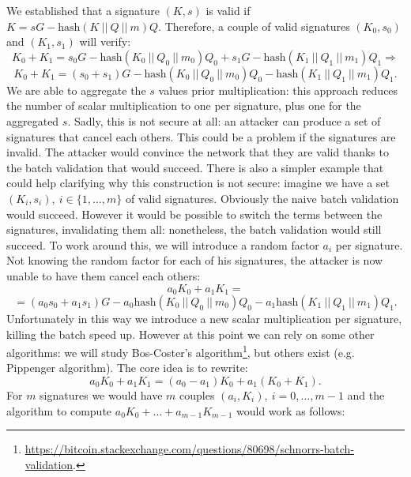 \bigskip
\noindent
We established that a signature $(K, s)$ is valid if $K = sG - \text{hash}(K \ || \ Q \ || \ m)Q$. 
Therefore, a couple of valid signatures $(K_0, s_0)$ and $(K_1, s_1)$ will verify:
$$K_0 + K_1 = s_0G - \text{hash}(K_0 \ || \ Q_0 \ || \ m_0)Q_0 + s_1G - \text{hash}(K_1 \ || \ Q_1 \ || \ m_1)Q_1 \Longrightarrow
$$
$$K_0 + K_1 = (s_0 + s_1)G - \text{hash}(K_0 \ || \ Q_0 \ || \ m_0)Q_0 - \text{hash}(K_1 \ || \ Q_1 \ || \ m_1)Q_1.$$
We are able to aggregate the $s$ values prior multiplication: this approach reduces the number of scalar multiplication to one per signature, plus one for the aggregated $s$. Sadly, this is not secure at all: an attacker can produce a set of signatures that cancel each others. This could be a problem if the signatures are invalid. The attacker would convince the network that they are valid thanks to the batch validation that would succeed. There is also a simpler example that could help clarifying why this construction is not secure: imagine we have a set $(K_i, s_i), \ i \in \{1, ..., m\}$ of valid signatures. Obviously the naive batch validation would succeed. However it would be possible to switch the terms between the signatures, invalidating them all: nonetheless, the batch validation would still succeed. To work around this, we will introduce a random factor $a_i$ per signature. Not knowing the random factor for each of his signatures, the attacker is now unable to have them cancel each others:
$$a_0K_0 + a_1K_1 = $$
$$= (a_0s_0 + a_1s_1)G - a_0\text{hash}(K_0 \ || \ Q_0 \ || \ m_0)Q_0 - a_1\text{hash}(K_1 \ || \ Q_1 \ || \ m_1)Q_1.$$
Unfortunately in this way we introduce a new scalar multiplication per signature, killing the batch speed up. However at this point we can rely on some other algorithms: we will study Bos-Coster's algorithm\footnote{\url{https://bitcoin.stackexchange.com/questions/80698/schnorrs-batch-validation}.}, but others exist (e.g. Pippenger algorithm). The core idea is to rewrite:
$$a_0K_0 + a_1K_1 = (a_0 - a_1)K_0 + a_1(K_0 + K_1).$$
For $m$ signatures we would have $m$ couples $(a_i, K_i), \ i = 0, ..., m - 1$ and the algorithm to compute $a_0K_0 + ... + a_{m - 1}K_{m - 1}$ would work as follows:
